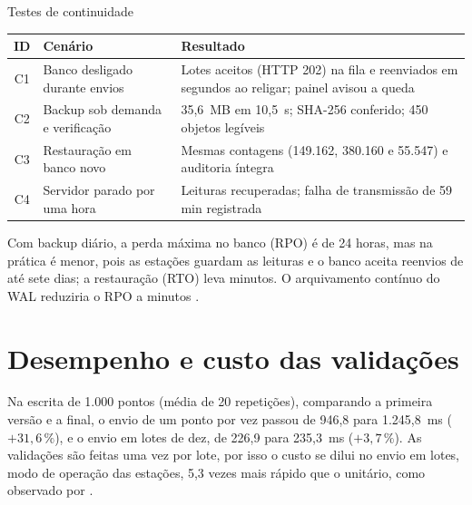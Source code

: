 \begin{quadro}[htb]
  \caption{Testes de continuidade}\label{qua:testes-cont}
  \scriptsize
  \begin{tabularx}{\textwidth}{|c|Y|Y|}
    \hline
    \textbf{ID} & \textbf{Cenário} & \textbf{Resultado} \\ \hline
    C1 & Banco desligado durante envios & Lotes aceitos (HTTP 202) na fila e reenviados em segundos ao religar; painel avisou a queda \\ \hline
    C2 & Backup sob demanda e verificação & 35,6~MB em 10,5~s; SHA-256 conferido; 450 objetos legíveis \\ \hline
    C3 & Restauração em banco novo & Mesmas contagens (149.162, 380.160 e 55.547) e auditoria íntegra \\ \hline
    C4 & Servidor parado por uma hora & Leituras recuperadas; falha de transmissão de 59 min registrada \\ \hline
  \end{tabularx}
\end{quadro}

Com backup diário, a perda máxima no banco (RPO) é de 24 horas, mas na prática é menor, pois as estações guardam as leituras e o banco aceita reenvios de até sete dias; a restauração (RTO) leva minutos. O arquivamento contínuo do WAL reduziria o RPO a minutos \parencite{pgbackup}.

\section{Desempenho e custo das validações}

Na escrita de 1.000 pontos (média de 20 repetições), comparando a primeira versão e a final, o envio de um ponto por vez passou de 946,8 para 1.245,8~ms ($+31{,}6\,\%$), e o envio em lotes de dez, de 226,9 para 235,3~ms ($+3{,}7\,\%$). As validações são feitas uma vez por lote, por isso o custo se dilui no envio em lotes, modo de operação das estações, 5,3 vezes mais rápido que o unitário, como observado por \textcite{grzesik2020}.


